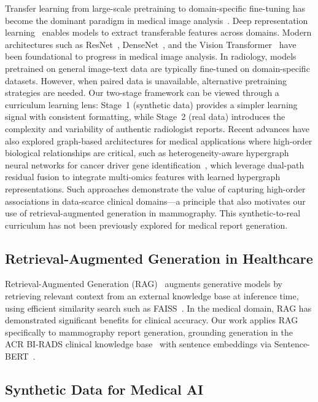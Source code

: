 \documentclass{wlscirep}
\begin{document}
Transfer learning from large-scale pretraining to domain-specific fine-tuning has become the dominant paradigm in medical image analysis~\cite{pan2010transfer, zhuang2021survey}. Deep representation learning~\cite{bengio2012deep} enables models to extract transferable features across domains. Modern architectures such as ResNet~\cite{he2016deep}, DenseNet~\cite{huang2017densely}, and the Vision Transformer~\cite{dosovitskiy2021vit} have been foundational to progress in medical image analysis. In radiology, models pretrained on general image-text data are typically fine-tuned on domain-specific datasets. However, when paired data is unavailable, alternative pretraining strategies are needed. Our two-stage framework can be viewed through a curriculum learning lens: Stage~1 (synthetic data) provides a simpler learning signal with consistent formatting, while Stage~2 (real data) introduces the complexity and variability of authentic radiologist reports. Recent advances have also explored graph-based architectures for medical applications where high-order biological relationships are critical, such as heterogeneity-aware hypergraph neural networks for cancer driver gene identification~\cite{chen2026dprehgnn}, which leverage dual-path residual fusion to integrate multi-omics features with learned hypergraph representations. Such approaches demonstrate the value of capturing high-order associations in data-scarce clinical domains---a principle that also motivates our use of retrieval-augmented generation in mammography. This synthetic-to-real curriculum has not been previously explored for medical report generation.

\subsection*{Retrieval-Augmented Generation in Healthcare}

Retrieval-Augmented Generation (RAG)~\cite{lewis2020rag} augments generative models by retrieving relevant context from an external knowledge base at inference time, using efficient similarity search such as FAISS~\cite{johnson2020faiss}. In the medical domain, RAG has demonstrated significant benefits for clinical accuracy. Our work applies RAG specifically to mammography report generation, grounding generation in the ACR BI-RADS clinical knowledge base~\cite{birads2013} with sentence embeddings via Sentence-BERT~\cite{reimers2019sentencebert}.

\subsection*{Synthetic Data for Medical AI}
\end{document}

